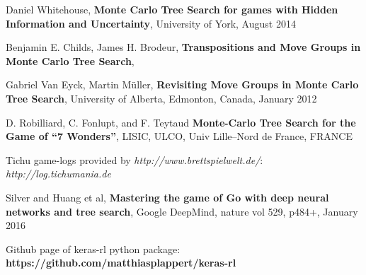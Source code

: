 \begin{thebibliography}{99}
Daniel Whitehouse,
\textbf{Monte Carlo Tree Search for games with Hidden Information and Uncertainty},
University of York,
August 2014

Benjamin E. Childs, James H. Brodeur,
\textbf{Transpositions and Move Groups in Monte Carlo Tree Search},

Gabriel Van Eyck, Martin Müller,
\textbf{Revisiting Move Groups in Monte Carlo Tree Search},
University of Alberta, Edmonton, Canada,
January 2012

D. Robilliard, C. Fonlupt, and F. Teytaud
\textbf{Monte-Carlo Tree Search for the Game of “7 Wonders”},
LISIC, ULCO, Univ Lille–Nord de France, FRANCE


Tichu game-logs provided by \textit{http://www.brettspielwelt.de/}: \textit{http://log.tichumania.de}

Silver and Huang et al, \textbf{Mastering the game of Go with deep neural networks and tree search},
Google DeepMind, nature vol 529, p484+, January 2016

Github page of keras-rl python package: \textbf{https://github.com/matthiasplappert/keras-rl}




\end{thebibliography}
